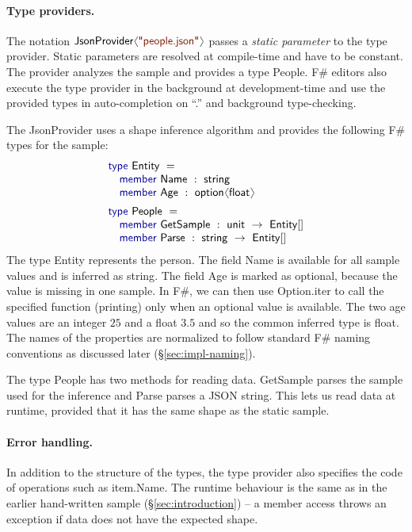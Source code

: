 \documentclass[10pt]{sigplanconf}
\newcommand{\langl}{\begin{picture}(4.5,7)
\put(1.1,2.5){\rotatebox{60}{\line(1,0){5.5}}}
\put(1.1,2.5){\rotatebox{300}{\line(1,0){5.5}}}
\end{picture}}
\newcommand{\rangl}{\begin{picture}(4.5,7)
\put(.9,2.5){\rotatebox{120}{\line(1,0){5.5}}}
\put(.9,2.5){\rotatebox{240}{\line(1,0){5.5}}}
\end{picture}}
\newcommand{\kvd}[1]{\textnormal{\textcolor{kvdclr}{\sffamily #1}}}
\newcommand{\str}[1]{\textnormal{\textcolor{strclr}{\sffamily "#1"}}}
\newcommand{\ident}[1]{\textnormal{\sffamily #1}}
\begin{document}
\paragraph{Type providers.}
The notation $\ident{JsonProvider}\langl\str{people.json}\rangl$ passes a \emph{static parameter} 
to the type provider. Static parameters are resolved at compile-time and have to be constant. 
The provider analyzes the sample and provides a type  \ident{People}. F\# editors also 
execute the type provider in the background at development-time and use the provided types 
in auto-completion on ``.'' and background type-checking.

The \ident{JsonProvider} uses a shape inference algorithm and provides
the following F\# types for the sample:
%
\begin{equation*}
\begin{array}{l}
 \kvd{type}~\ident{Entity}~=  \\
 \quad \kvd{member}~\ident{Name}~:~\ident{string} \\
 \quad \kvd{member}~\ident{Age}~:~\ident{option}\langl \ident{float}\rangl \\[0.5em]
 \kvd{type}~\ident{People}~=  \\
 \quad \kvd{member}~\ident{GetSample}~:~\ident{unit}~\rightarrow~\ident{Entity}[] \\
 \quad \kvd{member}~\ident{Parse}~:~\ident{string}~\rightarrow~\ident{Entity}[] \\
\end{array}
\end{equation*}
%
The type \ident{Entity} represents the person. The field \ident{Name} is available for all
sample values and is inferred as \ident{string}. The field \ident{Age} is marked as optional,
because the value is missing in one sample. In F\#, we can then use \ident{Option.iter} to call
the specified function (printing) only when an optional value is available. The two age values 
are an integer $25$ and a float $3.5$ and so the common inferred type is \ident{float}.
The names of the properties are normalized to follow standard F\# naming conventions
as discussed later (\S\ref{sec:impl-naming}).

The type \ident{People} has two methods for reading data. \ident{GetSample} parses the
sample used for the inference and \ident{Parse} parses a JSON string. This lets us read
data at runtime, provided that it has the same shape as the static sample.

\paragraph{Error handling.}
In addition to the structure of the types, the type provider also specifies the code of 
operations such as \ident{item.Name}. The runtime behaviour is 
the same as in the earlier hand-written sample (\S\ref{sec:introduction}) -- a member access 
throws an exception if data does not have the expected shape.
\end{document}
